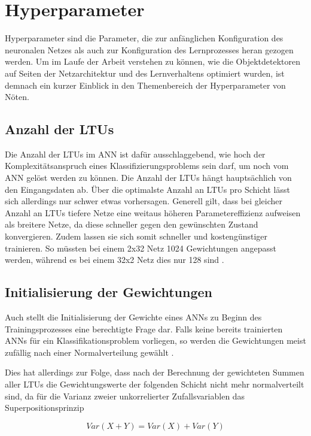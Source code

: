 \section{Hyperparameter}

Hyperparameter sind die Parameter, die zur anfänglichen Konfiguration des neuronalen Netzes als auch zur Konfiguration des Lernprozesses heran gezogen werden. Um im Laufe der Arbeit verstehen zu können, wie die Objektdetektoren auf Seiten der Netzarchitektur und des Lernverhaltens optimiert wurden, ist demnach ein kurzer Einblick in den Themenbereich der Hyperparameter von Nöten.

\subsection*{Anzahl der LTUs}
Die Anzahl der LTUs im ANN ist dafür ausschlaggebend, wie hoch der Komplexitätsanspruch eines Klassifizierungsproblems sein darf, um noch vom ANN gelöst werden zu können. Die Anzahl der LTUs hängt hauptsächlich von den Eingangsdaten ab. Über die optimalste Anzahl an LTUs pro Schicht lässt sich allerdings nur schwer etwas vorhersagen. Generell gilt, dass bei gleicher Anzahl an LTUs tiefere Netze eine weitaus höheren Parametereffizienz aufweisen als breitere Netze, da diese schneller gegen den gewünschten Zustand konvergieren. Zudem lassen sie sich somit schneller und kostengünstiger trainieren. So müssten bei einem 2x32 Netz 1024 Gewichtungen angepasst werden, während es bei einem 32x2 Netz dies nur 128 sind \cite{AurelienGeron.2018}.

\subsection*{Initialisierung der Gewichtungen}
Auch stellt die Initialisierung der Gewichte eines ANNs zu Beginn des Trainingsprozesses eine berechtigte Frage dar. Falls keine bereits trainierten ANNs für ein Klassifikationsproblem vorliegen, so werden die Gewichtungen meist zufällig nach einer Normalverteilung gewählt \cite{AurelienGeron.2018}. 

Dies hat allerdings zur Folge, dass nach der Berechnung der gewichteten Summen aller LTUs die Gewichtungswerte der folgenden Schicht nicht mehr normalverteilt sind, da für die Varianz zweier unkorrelierter Zufallsvariablen das Superpositionsprinzip

\begin{equation} \label{varianz}
Var(X + Y) = Var(X) + Var(Y)
\end{equation}

